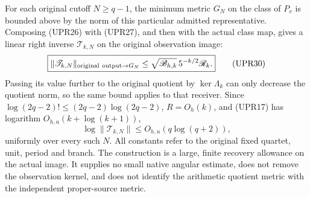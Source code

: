 For each original cutoff \(N\ge q-1\), the minimum metric \(G_N\)
on the class of \(P_v\) is bounded above by the norm of this
particular admitted representative.  Composing (UPR26) with
(UPR27), and then with the actual class map, gives a linear
right inverse \(\mathscr T_{k,N}\) on the original observation image:
\[
\boxed{\displaystyle
\|\mathscr T_{k,N}\|_{{\rm original\ output}\to G_N}
\le \sqrt{\mathscr B_{h,k}}\,5^{-k/2}\mathscr R_k.}
\tag{UPR30}
\]
Passing its value further to the original quotient by
\(\ker\Lambda_k\) can only decrease the quotient norm, so the same
bound applies to that receiver.
Since \(\log(2q-2)!\le(2q-2)\log(2q-2)\), \(R=O_h(k)\),
and (UPR17) has logarithm \(O_{h,u}(k+\log(k+1))\),
\[
\log\|\mathscr T_{k,N}\|
\le O_{h,u}(q\log(q+2)),
\tag{UPR31}
\]
uniformly over every such \(N\).
All constants refer to the original fixed quartet, unit, period
and branch.  The construction is a large, finite recovery allowance
on the actual image.  It supplies no small native angular estimate,
does not remove the observation kernel, and does not identify the
arithmetic quotient metric with the independent proper-source metric.
\endgroup


